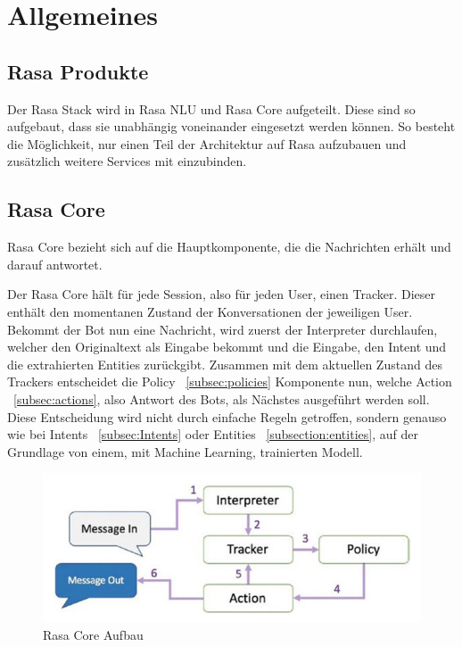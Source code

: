 \section{Allgemeines}\label{sec:overview}

\subsection{Rasa Produkte}\label{sec:rasa-products}

Der Rasa Stack wird in Rasa NLU und Rasa Core aufgeteilt.
Diese sind so aufgebaut, dass sie unabhängig voneinander eingesetzt werden können.
So besteht die Möglichkeit, nur einen Teil der Architektur auf Rasa aufzubauen und zusätzlich weitere Services mit einzubinden.

\subsection{Rasa Core}\label{subsec:rasa-core}

Rasa Core bezieht sich auf die Hauptkomponente, die die Nachrichten erhält und darauf antwortet.\cite{rasaCore}

Der Rasa Core hält für jede Session, also für jeden User, einen Tracker.
Dieser enthält den momentanen Zustand der Konversationen der jeweiligen User.
Bekommt der Bot nun eine Nachricht, wird zuerst der Interpreter durchlaufen, welcher den Originaltext als Eingabe bekommt und die Eingabe, den Intent und die extrahierten Entities zurückgibt.
Zusammen mit dem aktuellen Zustand des Trackers entscheidet die Policy ~\ref{subsec:policies} Komponente nun, welche Action ~\ref{subsec:actions}, also Antwort des Bots, als Nächstes ausgeführt werden soll.
Diese Entscheidung wird nicht durch einfache Regeln getroffen, sondern genauso wie bei Intents ~\ref{subsec:Intents} oder Entities ~\ref{subsection:entities}, auf der Grundlage von einem, mit Machine Learning, trainierten Modell.\cite{rasaCore, rasaCoreBook}

\begin{figure}[hbt!]
    \centering
    \includegraphics[scale=0.5]{pics/rasa-core}
    \caption{Rasa Core Aufbau~\cite{rasaCoreBook}}
    \label{fig:rasa_core}
\end{figure}

